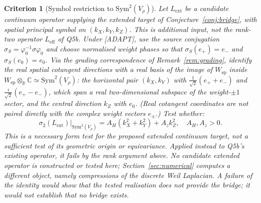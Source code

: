 \documentclass[11pt,a4paper]{article}
\newtheorem{criterion}[theorem]{Criterion}
\newcommand{\Vr}{V_\rho}
\newcommand{\Sym}{\mathrm{Sym}}
\begin{document}
  \begin{criterion}[Symbol restriction to $\Sym^2(\Vr)$]
    \label{crit:symbol}
    Let $L_{\mathrm{ext}}$ be a candidate continuum operator supplying the extended target of
    Conjecture~\ref{conj:bridge}, with spatial principal symbol on $(k_X,k_Y,k_Z)$.
    This is additional input, not the rank-two operator $L_{\mathrm{eff}}$ of Q5b.
    Under [ADAPT], use the source conjugation
    $\sigma_S=\varphi_0^{-1}\sigma\varphi_0$ and choose normalised weight phases so that
    $\sigma_S(e_+)=e_-$ and $\sigma_S(e_0)=e_0$.
    Via the grading correspondence of Remark~\ref{rem:grading}, identify the real spatial cotangent
    directions with a real basis of the image of $W_{\mathrm{sp}}$ inside
    $W_{\mathrm{sp}} \otimes_\mathbb{R} \mathbb{C} \simeq \Sym^2(\Vr)$: the horizontal pair
    $(k_X, k_Y)$ with $\tfrac{1}{\sqrt 2}(e_+ + e_-)$ and $\tfrac{i}{\sqrt 2}(e_+ - e_-)$, which
    span a real two-dimensional subspace of the weight-$\pm 1$ sector, and the central direction
    $k_Z$ with $e_0$.
    (Real cotangent coordinates are not paired directly with the complex weight vectors $e_\pm$.)
    Test whether:
    \begin{equation}
      \sigma_2(L_{\mathrm{ext}})\big|_{\Sym^2(\Vr)} = A_H (k_X^2 + k_Y^2) + A_z k_Z^2,
      \quad A_H, A_z > 0.
    \end{equation}
    This is a necessary form test for the proposed extended continuum target, not a sufficient
    test of its geometric origin or equivariance.
    Applied instead to Q5b's existing operator, it fails by the rank argument above.
    No candidate extended operator is constructed or tested here;
    Section~\ref{sec:numerical} computes a different object, namely compressions of the discrete
    Weil Laplacian.
    A failure of the identity would show that the tested realisation does not provide the bridge;
    it would not establish that no bridge exists.
  \end{criterion}
\end{document}
